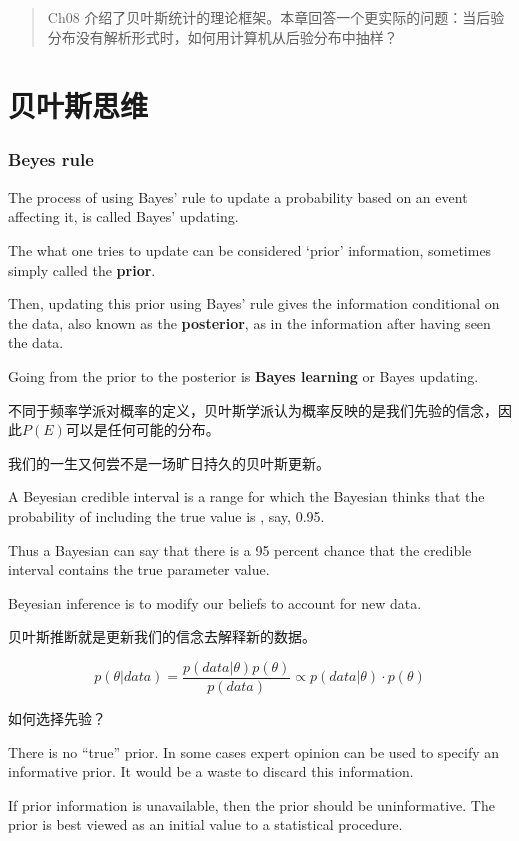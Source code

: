 \documentclass[
]{book}
\begin{document}
\begin{quote}
Ch08 介绍了贝叶斯统计的理论框架。本章回答一个更实际的问题：当后验分布没有解析形式时，如何用计算机从后验分布中抽样？
\end{quote}

\section{贝叶斯思维}\label{ux8d1dux53f6ux65afux601dux7ef4}

\subsubsection{Beyes rule}\label{beyes-rule}

The process of using Bayes' rule to update a probability based on an event affecting it, is called Bayes' updating.

The what one tries to update can be considered `prior' information, sometimes simply called the \textbf{prior}.

Then, updating this prior using Bayes' rule gives the information conditional on the data, also known as the \textbf{posterior}, as in the information after having seen the data.

Going from the prior to the posterior is \textbf{Bayes learning} or Bayes updating.

不同于频率学派对概率的定义，贝叶斯学派认为概率反映的是我们先验的信念，因此\(P(E)\)可以是任何可能的分布。

我们的一生又何尝不是一场旷日持久的贝叶斯更新。

A Beyesian credible interval is a range for which the Bayesian thinks that the probability of including the true value is , say, 0.95.

Thus a Bayesian can say that there is a 95 percent chance that the credible interval contains the true parameter value.

Beyesian inference is to modify our beliefs to account for new data.

贝叶斯推断就是更新我们的信念去解释新的数据。

\[
p(\theta|data) = \frac{p(data|\theta)p(\theta)}{p(data)}\propto p(data|\theta)\cdot p(\theta)
\]

如何选择先验？

There is no ``true'' prior. In some cases expert opinion can be used to specify an informative prior. It would be a waste to discard this information.

If prior information is unavailable, then the prior should be uninformative. The prior is best viewed as an initial value to a statistical procedure.
\end{document}
